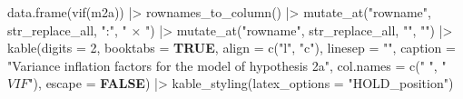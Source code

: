 \documentclass[
  bookmarksnumbered]{article}
\newenvironment{Shaded}{\begin{snugshade}}{\end{snugshade}}
\newcommand{\AttributeTok}[1]{\textcolor[rgb]{0.80,0.80,0.80}{#1}}
\newcommand{\ConstantTok}[1]{\textcolor[rgb]{0.86,0.64,0.64}{\textbf{#1}}}
\newcommand{\DecValTok}[1]{\textcolor[rgb]{0.86,0.86,0.80}{#1}}
\newcommand{\FunctionTok}[1]{\textcolor[rgb]{0.94,0.94,0.56}{#1}}
\newcommand{\NormalTok}[1]{\textcolor[rgb]{0.80,0.80,0.80}{#1}}
\newcommand{\SpecialCharTok}[1]{\textcolor[rgb]{0.86,0.64,0.64}{#1}}
\newcommand{\StringTok}[1]{\textcolor[rgb]{0.80,0.58,0.58}{#1}}
\begin{document}
\begin{Shaded}
\begin{Highlighting}[]
\FunctionTok{data.frame}\NormalTok{(}\FunctionTok{vif}\NormalTok{(m2a)) }\SpecialCharTok{|\textgreater{}} 
  \FunctionTok{rownames\_to\_column}\NormalTok{() }\SpecialCharTok{|\textgreater{}} 
  \FunctionTok{mutate\_at}\NormalTok{(}\StringTok{"rowname"}\NormalTok{, str\_replace\_all, }\StringTok{":"}\NormalTok{, }\StringTok{" × "}\NormalTok{) }\SpecialCharTok{|\textgreater{}}
  \FunctionTok{mutate\_at}\NormalTok{(}\StringTok{"rowname"}\NormalTok{, str\_replace\_all, }\StringTok{"\textasciigrave{}"}\NormalTok{, }\StringTok{""}\NormalTok{) }\SpecialCharTok{|\textgreater{}} 
  \FunctionTok{kable}\NormalTok{(}\AttributeTok{digits =} \DecValTok{2}\NormalTok{,}
        \AttributeTok{booktabs =} \ConstantTok{TRUE}\NormalTok{,}
        \AttributeTok{align =} \FunctionTok{c}\NormalTok{(}\StringTok{"l"}\NormalTok{, }\StringTok{"c"}\NormalTok{),}
        \AttributeTok{linesep =} \StringTok{""}\NormalTok{,}
        \AttributeTok{caption =} \StringTok{"Variance inflation factors for the model of hypothesis 2a"}\NormalTok{,}
        \AttributeTok{col.names =} \FunctionTok{c}\NormalTok{(}\StringTok{" "}\NormalTok{,}
                      \StringTok{"$VIF$"}\NormalTok{),}
        \AttributeTok{escape =} \ConstantTok{FALSE}\NormalTok{) }\SpecialCharTok{|\textgreater{}}
  \FunctionTok{kable\_styling}\NormalTok{(}\AttributeTok{latex\_options =} \StringTok{"HOLD\_position"}\NormalTok{)}
\end{Highlighting}
\end{Shaded}
\end{document}
